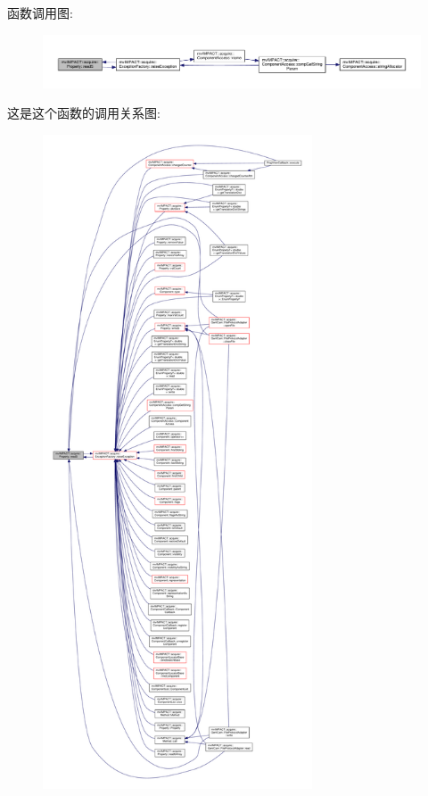 函数调用图\+:
\nopagebreak
\begin{figure}[H]
\begin{center}
\leavevmode
\includegraphics[width=350pt]{classmv_i_m_p_a_c_t_1_1acquire_1_1_property_aa5fe87d8c899f71c88a7cacb4da2fb43_cgraph}
\end{center}
\end{figure}




这是这个函数的调用关系图\+:
\nopagebreak
\begin{figure}[H]
\begin{center}
\leavevmode
\includegraphics[height=550pt]{classmv_i_m_p_a_c_t_1_1acquire_1_1_property_aa5fe87d8c899f71c88a7cacb4da2fb43_icgraph}
\end{center}
\end{figure}


